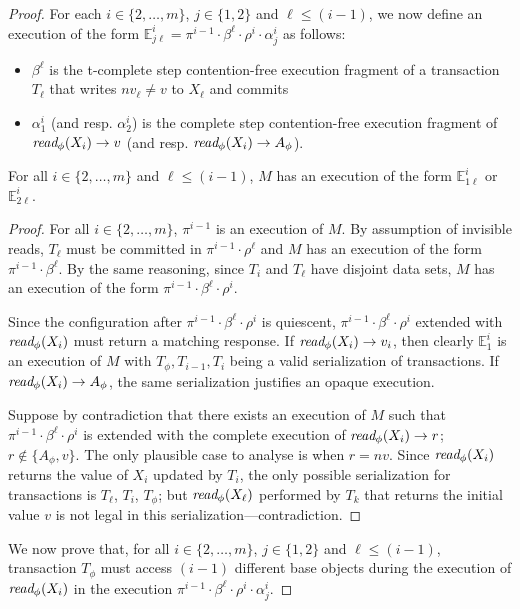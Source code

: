 \begin{proof}
For each $i\in \{2,\ldots, m\}$, $j\in \{1,2\}$ and $\ell \leq (i-1)$, 
we now define an execution of the form  $\mathbb{E}_{j\ell}^{i}=\pi^{i-1}\cdot \beta^{\ell}\cdot \rho^i \cdot \alpha_j^i$
as follows:
%
\begin{itemize}
\item
$\beta^{\ell}$ is the t-complete step contention-free execution fragment of a transaction $T_{\ell}$
that writes $nv_{\ell}\neq v$ to $X_{\ell}$ and commits
\item
$\alpha_1^i$ (and resp. $\alpha_2^i$) is the complete step contention-free execution fragment of 
$\textit{read}_{\phi}(X_i) \rightarrow v$ (and resp. $\textit{read}_{\phi}(X_i) \rightarrow A_{\phi}$).
\end{itemize}
%
\begin{claim}
\label{cl:ic2}
For all $i\in \{2,\ldots, m\}$ and $\ell \leq (i-1)$, $M$ has an execution of the form $\mathbb{E}_{1\ell}^{i}$ or 
$\mathbb{E}_{2\ell}^{i}$.
\end{claim}
%
\begin{proof}
%
For all $i \in \{2,\ldots, m\}$, $\pi^{i-1}$
is an execution of $M$.
By assumption of invisible reads, $T_{{\ell}}$ must be committed in $\pi^{i-1}\cdot \rho^{\ell}$
and $M$ has an execution of the form $\pi^{i-1}\cdot \beta^{\ell}$.
By the same reasoning, since $T_i$ and $T_{\ell}$ have disjoint data sets,
$M$ has an execution of the form $\pi^{i-1}\cdot\beta^{\ell}\cdot \rho^i$.

Since the configuration after $\pi^{i-1}\cdot\beta^{\ell}\cdot \rho^i$ is quiescent,
$\pi^{i-1}\cdot\beta^{\ell}\cdot \rho^i$ extended with $\textit{read}_{\phi}(X_i)$
must return a matching response.
If $\textit{read}_{\phi}(X_i) \rightarrow v_i$, then clearly $\mathbb{E}_{1}^{i}$
is an execution of $M$ with $T_{\phi}, T_{i-1}, T_i$ being a valid serialization
of transactions.
If $\textit{read}_{\phi}(X_i) \rightarrow A_{\phi}$, the same serialization
justifies an opaque execution.

Suppose by contradiction that there exists an execution of $M$ such that
$\pi^{i-1}\cdot\beta^{\ell}\cdot \rho^i$ is extended with the complete execution
of $\textit{read}_{\phi}(X_i) \rightarrow r$; $r \not\in \{A_{\phi},v\}$. 
The only plausible case to analyse is when $r=nv$.
Since $\textit{read}_{\phi}(X_i)$ returns the value of $X_i$ updated by $T_i$, 
the only possible serialization for transactions is $T_{\ell}$, $T_i$, $T_{\phi}$; but $\textit{read}_{\phi}(X_{\ell})$
performed by $T_k$ that returns the initial value $v$
is not legal in this serialization---contradiction.
\end{proof}
%
We now prove that, for all $i\in \{2,\ldots, m\}$, $j\in \{1,2\}$ and $\ell \leq (i-1)$, transaction $T_{\phi}$ must access
$(i-1)$ different base objects during the execution of $\textit{read}_{\phi}(X_i)$ in the execution
$\pi^{i-1}\cdot \beta^{\ell}\cdot \rho^i \cdot \alpha_j^i$.


\end{proof}
